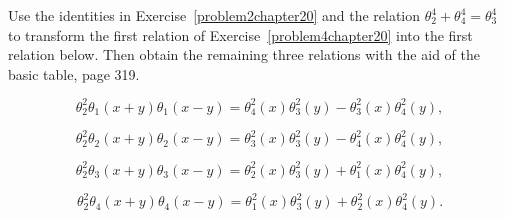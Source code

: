 \begin{problem}\label{problem5chapter20}
Use the identities in Exercise~\ref{problem2chapter20} and the relation $\theta_2^4 + \theta_4^4=\theta_3^4$ to transform the first relation of Exercise~\ref{problem4chapter20} into the first relation below. Then obtain the remaining three relations with the aid of the basic table, page 319.

$$\theta_2^2\theta_1(x+y)\theta_1(x-y)=\theta_4^2(x)\theta_3^2(y)-\theta_3^2(x)\theta_4^2(y),$$

$$\theta_2^2\theta_2(x+y)\theta_2(x-y)=\theta_3^2(x)\theta_3^2(y)-\theta_4^2(x)\theta_4^2(y),$$

$$\theta_2^2\theta_3(x+y)\theta_3(x-y)=\theta_2^2(x)\theta_3^2(y)+\theta_1^2(x)\theta_4^2(y),$$

$$\theta_2^2\theta_4(x+y)\theta_4(x-y)=\theta_1^2(x)\theta_3^2(y)+\theta_2^2(x)\theta_4^2(y).$$
\end{problem}
